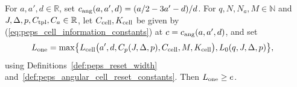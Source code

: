 \begin{definition}
    \label{def:peps_angular_single_scale_constants}
    \leanok
    For $a,a',d\in\mathbb R$, set $c_{\rm ang}(a,a',d)=(a/2-3a'-d)/d$.
    For $q,N,N_a,M\in\mathbb N$ and $J,\Delta,p,C_{\rm tpl},C_a\in\mathbb R$, let $C_{\rm cell},K_{\rm cell}$ be given by (\ref{eq:peps_cell_information_constants}) at $c=c_{\rm ang}(a,a',d)$, and set
    \begin{align}
        L_{\rm one} & =\max\bigl\{L_{\rm cell}\bigl(a',d,C_p(J,\Delta,p),C_{\rm cell},M,
        K_{\rm cell}\bigr),L_0(q,J,\Delta,p)\bigr\},
        \label{eq:peps_angular_single_scale_threshold}
    \end{align}
    using Definitions~\ref{def:peps_reset_width} and~\ref{def:peps_angular_cell_reset_constants}. Then $L_{\rm one}\ge e$.
\end{definition}

